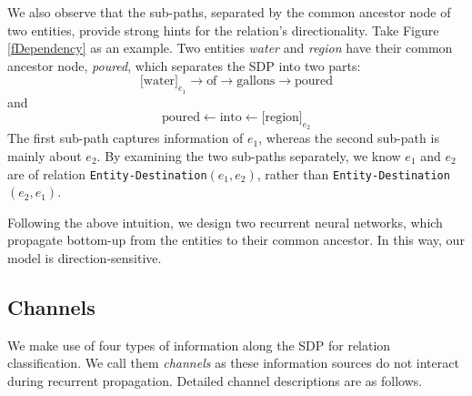 \documentclass[11pt,a4paper]{article}
\begin{document}
We also observe that the sub-paths, separated by
the common ancestor node of two entities,
provide strong hints for the relation's directionality.
Take Figure \ref{fDependency} as an example.
Two entities \textit{water} and \textit{region}
have their common ancestor node, \textit{poured}, which
separates the SDP into two parts:
$$\text{[water]}_{e_1}\rightarrow\text{of}\rightarrow\text{gallons}\rightarrow
\text{poured}$$
and
$$\text{poured}\leftarrow\text{into}\leftarrow\text{[region]}_{e_2}$$
The first sub-path captures information of $e_1$, whereas the second sub-path
is mainly about $e_2$.
By examining the two sub-paths separately, we know $e_1$ and $e_2$ are
of relation \verb|Entity-|\verb|Destination|$(e_1, e_2)$, rather
than \verb|Entity-Destination|$(e_2, e_1)$.

Following the above intuition,
we design two recurrent neural networks,
which propagate bottom-up from the entities to their common ancestor.
In this way, our model is direction-sensitive.

\subsection{Channels}\label{ssChannels}
We make use of four types of information along the SDP for relation classification.
We call them \textit{channels} as these information sources do not interact during
recurrent propagation. 
Detailed channel descriptions are as follows.
\end{document}

